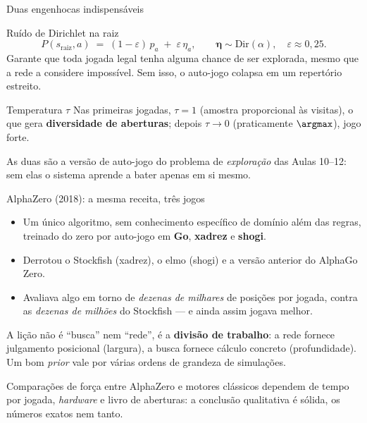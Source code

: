 \documentclass[aspectratio=169, 11pt]{beamer}
\newcommand{\raiz}{s_{\mathrm{raiz}}}
\begin{document}
\begin{frame}{Duas engenhocas indispensáveis}
  \begin{defbox}{Ruído de Dirichlet na raiz}
    \[
      P(\raiz, a) \;=\; (1-\varepsilon)\, p_a \;+\; \varepsilon\, \eta_a,
      \qquad \bm{\eta} \sim \mathrm{Dir}(\alpha), \quad \varepsilon \approx 0{,}25 .
    \]
    Garante que toda jogada legal tenha alguma chance de ser explorada, mesmo
    que a rede a considere impossível. Sem isso, o auto-jogo colapsa em um
    repertório estreito.
  \end{defbox}

  \pause
  \begin{defbox}{Temperatura $\tau$}
    Nas primeiras jogadas, $\tau = 1$ (amostra proporcional às visitas), o que
    gera \textbf{diversidade de aberturas}; depois $\tau \to 0$
    (praticamente $\argmax$), jogo forte.
  \end{defbox}

  \pause
  \begin{alertabox}
    As duas são a versão de auto-jogo do problema de \emph{exploração} das
    Aulas 10--12: sem elas o sistema aprende a bater apenas em si mesmo.
  \end{alertabox}
\end{frame}

\begin{frame}{AlphaZero (2018): a mesma receita, três jogos}
  \begin{itemize}
    \item Um único algoritmo, sem conhecimento específico de domínio além das
          regras, treinado do zero por auto-jogo em \textbf{Go}, \textbf{xadrez}
          e \textbf{shogi}.
    \item Derrotou o Stockfish (xadrez), o elmo (shogi) e a versão anterior do
          AlphaGo Zero.
    \item Avaliava algo em torno de \emph{dezenas de milhares} de posições por
          jogada, contra as \emph{dezenas de milhões} do Stockfish --- e ainda
          assim jogava melhor.
  \end{itemize}

  \pause
  \begin{ideiabox}
    A lição não é ``busca'' nem ``rede'', é a \textbf{divisão de trabalho}:
    a rede fornece julgamento posicional (largura), a busca fornece cálculo
    concreto (profundidade). Um bom \emph{prior} vale por várias ordens de
    grandeza de simulações.
  \end{ideiabox}

  \pause
  \begin{alertabox}
    Comparações de força entre AlphaZero e motores clássicos dependem de tempo
    por jogada, \emph{hardware} e livro de aberturas: a conclusão qualitativa é
    sólida, os números exatos nem tanto.
  \end{alertabox}
\end{frame}
\end{document}
